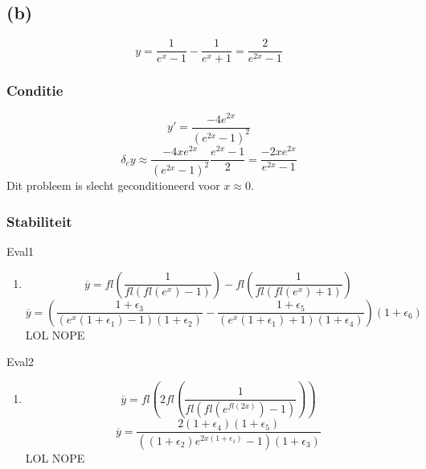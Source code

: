 \documentclass[12pt,a4paper]{article}
\begin{document}
\subsection{(b)}
\[
y = \frac{1}{e^x-1}-\frac{1}{e^x+1} = \frac{2}{e^{2x}-1}
\]

\subsubsection{Conditie}
\[
y' = \frac{-4e^{2x}}{(e^{2x}-1)^2}
\]
\[
\delta_cy \approx \frac{-4xe^{2x}}{(e^{2x}-1)^2}\frac{e^{2x}-1}{2}
= \frac{-2xe^{2x}}{e^{2x}-1}
\]
Dit probleem is slecht geconditioneerd voor $x\approx 0$.

\subsubsection{Stabiliteit}
Eval1
\begin{enumerate}
\item
\[
\overline{y} = fl\left(\frac{1}{fl(fl(e^x)-1)}\right) - fl\left(\frac{1}{fl(fl(e^x)+1)}\right)
\]
\[
\overline{y} 
=
\left(
\frac{1+\epsilon_3}{(e^x(1+\epsilon_1) - 1)(1+\epsilon_2)}
- \frac{1+\epsilon_5}{(e^x(1+\epsilon_1) + 1)(1+\epsilon_4)}
\right)
(1+\epsilon_6)
\]
LOL NOPE
\end{enumerate}

\noindent Eval2
\begin{enumerate}
\item
\[
\overline{y} = fl\left(2fl\left(\frac{1}{fl\left(fl\left(e^{fl(2x)}\right)-1\right)}\right)\right)
\]
\[
\overline{y} = \frac{2(1+\epsilon_4)(1+\epsilon_5)}{\left((1+\epsilon_2)e^{2x(1+\epsilon_1)} -1\right)(1+\epsilon_3)}
\]
LOL NOPE
\end{enumerate}
\end{document}
